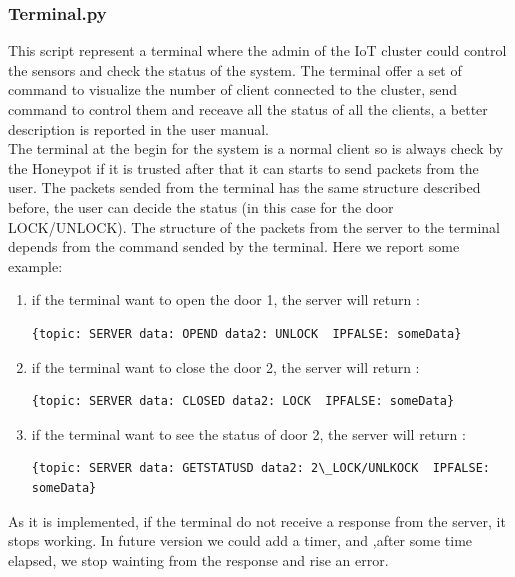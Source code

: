 \subsubsection{Terminal.py}
This script represent a terminal where the admin of the IoT cluster could control the sensors and check the status of the system. The terminal offer a set of command to visualize the number of client connected to the cluster, send command to control them and receave all the status of all the clients, a better description is reported in the user manual.\\
The terminal at the begin for the system is a normal client so is always check by the Honeypot if it is trusted after that it can starts to send packets from the user.
 The packets sended from the terminal has the same structure described before, the user can decide the status (in this case for the door LOCK/UNLOCK).
The structure of the packets from the server to the terminal depends from the command sended by the terminal. Here we report some example:
\begin{enumerate}
  \item if the terminal want to open the door 1, the server will return :  \begin{verbatim}{topic: SERVER data: OPEND data2: UNLOCK  IPFALSE: someData}\end{verbatim}
  \item  if the terminal want to close the door 2, the server will return :  \begin{verbatim}{topic: SERVER data: CLOSED data2: LOCK  IPFALSE: someData}\end{verbatim}
  \item if the terminal want to see the status of door 2, the server will return :  \begin{verbatim}{topic: SERVER data: GETSTATUSD data2: 2\_LOCK/UNLKOCK  IPFALSE: someData}\end{verbatim}
\end{enumerate}
As it is implemented, if the terminal do not receive a response from the server, it stops working.  In future version we could add a timer, and ,after some time elapsed, we stop wainting from the response and rise an error.




